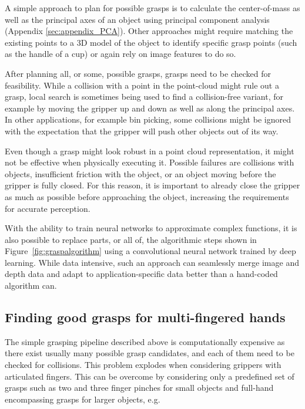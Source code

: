 A simple approach to plan for possible grasps is to calculate the center-of-mass as well as the principal axes of an object using principal component analysis (Appendix \ref{sec:appendix_PCA}). Other approaches might require matching the existing points to a 3D model of the object to identify specific grasp points (such as the handle of a cup) or again rely on image features to do so.

After planning all, or some, possible grasps, grasps need to be checked for feasibility. While a collision with a point in the point-cloud might rule out a grasp, local search is sometimes being used to find a collision-free variant, for example by moving the gripper up and down as well as along the principal axes. In other applications, for example bin picking, some collisions might be ignored with the expectation that the gripper will push other objects out of its way. 

Even though a grasp might look robust in a point cloud representation, it might not be effective when physically executing it. Possible failures are collisions with objects, insufficient friction with the object, or an object moving before the gripper is fully closed. For this reason, it is important to already close the gripper as much as possible before approaching the object, increasing the requirements for accurate perception. 

With the ability to train neural networks to approximate complex functions, it is also possible to replace parts, or all of, the algorithmic steps shown in Figure~\ref{fig:graspalgorithm} using a convolutional neural network trained by deep learning. While data intensive, such an approach can seamlessly merge image and depth data and adapt to application-specific data better than a hand-coded algorithm can. 

\subsection{Finding good grasps for multi-fingered hands}

The simple grasping pipeline described above is computationally expensive as there exist usually many possible grasp candidates, and each of them need to be checked for collisions. This problem explodes when considering grippers with articulated fingers. This can be overcome by considering only a predefined set of grasps such as two and three finger pinches for small objects and full-hand encompassing grasps for larger objects, e.g.

